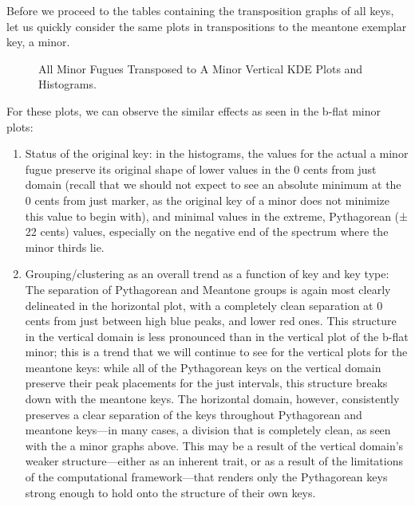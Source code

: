 Before we proceed to the tables containing the transposition graphs of
all keys, let us quickly consider the same plots in transpositions to
the meantone exemplar key, a minor.


    \begin{center}
    \end{center}
    


\begin{figure}[H]
\vspace{1.5em}
    \centering
    \caption{All Minor Fugues Transposed to A Minor Vertical KDE Plots and Histograms. }
\end{figure}    For these plots, we can observe the similar effects as seen in the
b-flat minor plots:

\begin{enumerate}
\def\labelenumi{\arabic{enumi}.}
\tightlist
\item
  Status of the original key: in the histograms, the values for the
  actual a minor fugue preserve its original shape of lower values in
  the 0 cents from just domain (recall that we should not expect to see
  an absolute minimum at the 0 cents from just marker, as the original
  key of a minor does not minimize this value to begin with), and
  minimal values in the extreme, Pythagorean (± 22 cents) values,
  especially on the negative end of the spectrum where the minor thirds
  lie.
\item
  Grouping/clustering as an overall trend as a function of key and key
  type: The separation of Pythagorean and Meantone groups is again most
  clearly delineated in the horizontal plot, with a completely clean
  separation at 0 cents from just between high blue peaks, and lower red
  ones. This structure in the vertical domain is less pronounced than in
  the vertical plot of the b-flat minor; this is a trend that we will
  continue to see for the vertical plots for the meantone keys: while
  all of the Pythagorean keys on the vertical domain preserve their peak
  placements for the just intervals, this structure breaks down with the
  meantone keys. The horizontal domain, however, consistently preserves
  a clear separation of the keys throughout Pythagorean and meantone
  keys---in many cases, a division that is completely clean, as seen
  with the a minor graphs above. This may be a result of the vertical
  domain's weaker structure---either as an inherent trait, or as a
  result of the limitations of the computational framework---that
  renders only the Pythagorean keys strong enough to hold onto the
  structure of their own keys.
\end{enumerate}


